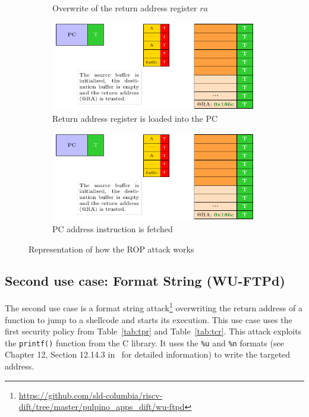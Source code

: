 \begin{figure}[ht]
\begin{subfigure}[b]{0.49\textwidth}
        \caption{Overwrite of the return address register $ra$}
        \label{fig:rop_attack_3}
    \end{subfigure}
    \hfill
    \begin{subfigure}[b]{0.49\textwidth}
        \includegraphics[width=\textwidth, page=4]{c3_vulnerabilities_assessment/img/buffer_overflow/schemaPedagogique.pdf}
        \caption{Return address register is loaded into the PC}
        \label{fig:rop_attack_4}
    \end{subfigure}
    \hfill
    \begin{subfigure}[b]{0.49\textwidth}
        \includegraphics[width=\textwidth, page=5]{c3_vulnerabilities_assessment/img/buffer_overflow/schemaPedagogique.pdf}
        \caption{PC address instruction is fetched}
        \label{fig:rop_attack_5}
    \end{subfigure}
    \caption{Representation of how the ROP attack works}
    \label{fig:rop_attack}
\end{figure}

\subsection{Second use case: Format String (WU-FTPd)}
The second use case is a format string attack\footnote{\url{https://github.com/sld-columbia/riscv-dift/tree/master/pulpino_apps_dift/wu-ftpd}} overwriting the return address of a function to jump to a shellcode and starts its execution.  This use case uses the first security policy from Table~\ref{tab:tpr} and Table~\ref{tab:tcr}.
This attack exploits the \verb|printf()| function from the C library. It uses the \verb|%u| and \verb|%n| formats (see Chapter 12, Section 12.14.3 in~\cite{gnu_lib_c} for detailed information) to write the targeted address.

